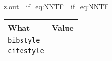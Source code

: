 \begin{VerbatimOut}{z.out}
\ExplSyntaxOn
  \str_if_eq:NNTF
    \ZZibibstyle
    \ZZbibstyle
    {\def\ZZtmpa{\ZZibibstyle}}
    {\def\ZZtmpa{\ZZibibstyle\space overridden~with~\ZZbibstyle}}
  \str_if_eq:NNTF
    \ZZicitestyle
    \ZZcitestyle
    {\def\ZZtmpb{\ZZicitestyle}}
    {\def\ZZtmpb{\ZZicitestyle\space overridden~with~\ZZcitestyle}}
\ExplSyntaxOff
\begin{tabular}{@{}ll@{}}
  \noalign{\vspace*{6pt}}
  \toprule
  \bfseries What& \bfseries Value\\
  \midrule
  \verb+bibstyle+& \ZZtmpa\\
  \verb+citestyle+& \ZZtmpb\\
  \bottomrule
\end{tabular}
\end{VerbatimOut}

\MyIO




